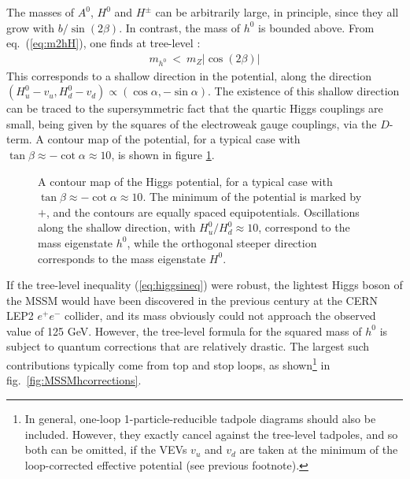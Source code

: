 \documentclass[12pt]{article}
\def\beq{\begin{eqnarray}}
\def\eeq{\end{eqnarray}}
\begin{document}
The masses of $A^0$, $H^0$ and $H^\pm$ can be arbitrarily
large, in principle, since they all grow with $b/\sin (2\beta)$. In contrast, the mass of
$h^0$ is bounded above. From eq.~(\ref{eq:m2hH}), one finds
at tree-level \cite{treelevelhiggsbound}:
\beq
m_{h^0} \><\> m_Z  |\cos (2\beta) | 
\label{eq:higgsineq}
\eeq
This corresponds to a shallow direction in the %
potential, along the 
direction $(H_u^0-v_u, H_d^0-v_d) \propto (\cos\alpha,-\sin\alpha)$. The 
existence of this shallow direction can be traced to the supersymmetric fact that the 
quartic Higgs couplings are small, being given by the squares of the electroweak gauge 
couplings, via the $D$-term. A contour map of the potential, for a typical 
case with $\tan\beta \approx -\cot\alpha \approx 10$, is shown in figure 
\ref{fig:contourmap}.%
\begin{figure}
\centerline{}
\vspace{-0.32cm}
\caption{A contour map of the Higgs potential, for a typical case with
$\tan\beta \approx -\cot\alpha \approx 10$. The minimum of the potential
is marked by $+$, and the contours are equally spaced equipotentials.
Oscillations along the shallow direction, with $H^0_u/H_d^0 \approx 10$,
correspond to the mass eigenstate $h^0$, while the orthogonal steeper
direction corresponds to the mass eigenstate $H^0$.\label{fig:contourmap}}
\end{figure}
%
If the tree-level inequality (\ref{eq:higgsineq}) were robust, the 
lightest Higgs boson of the MSSM would have been discovered in the previous century
at the CERN LEP2 $e^+e^-$ collider, and its mass obviously could not approach the 
observed value of 125 GeV.  
However, the tree-level formula for the squared mass of $h^0$ is subject 
to quantum corrections that are relatively drastic. The largest such 
contributions typically come from top and stop loops, as 
shown\footnote{In general, one-loop 1-particle-reducible 
tadpole diagrams should also be included.
However, they exactly cancel against the tree-level
tadpoles, and so both can be omitted,
if the VEVs $v_u$ and $v_d$ are taken at the minimum of the 
loop-corrected effective potential (see previous footnote).} 
in fig.~\ref{fig:MSSMhcorrections}.%
\end{document}
